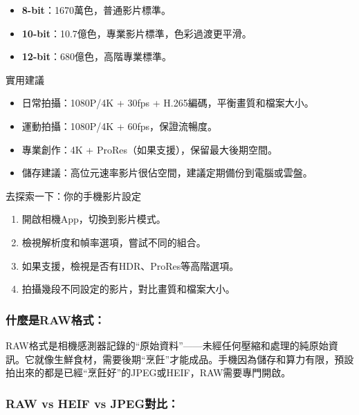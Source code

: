 \begin{itemize}
  \item \textbf{8-bit}：1670萬色，普通影片標準。
  \item \textbf{10-bit}：10.7億色，專業影片標準，色彩過渡更平滑。
  \item \textbf{12-bit}：680億色，高階專業標準。
\end{itemize}

\begin{tcbinfo}{實用建議}
\begin{itemize}
  \item 日常拍攝：1080P/4K + 30fps + H.265編碼，平衡畫質和檔案大小。
  \item 運動拍攝：1080P/4K + 60fps，保證流暢度。
  \item 專業創作：4K + ProRes（如果支援），保留最大後期空間。
  \item 儲存建議：高位元速率影片很佔空間，建議定期備份到電腦或雲盤。
\end{itemize}

\end{tcbinfo}

\begin{tcbpractice}{去探索一下：你的手機影片設定}
\begin{enumerate}
  \item 開啟相機App，切換到影片模式。
  \item 檢視解析度和幀率選項，嘗試不同的組合。
  \item 如果支援，檢視是否有HDR、ProRes等高階選項。
  \item 拍攝幾段不同設定的影片，對比畫質和檔案大小。
\end{enumerate}

\end{tcbpractice}


\subsubsection*{什麼是RAW格式：}

RAW格式是相機感測器記錄的“原始資料”——未經任何壓縮和處理的純原始資訊。它就像生鮮食材，需要後期“烹飪”才能成品。手機因為儲存和算力有限，預設拍出來的都是已經“烹飪好”的JPEG或HEIF，RAW需要專門開啟。

\subsubsection*{RAW vs HEIF vs JPEG對比：}

